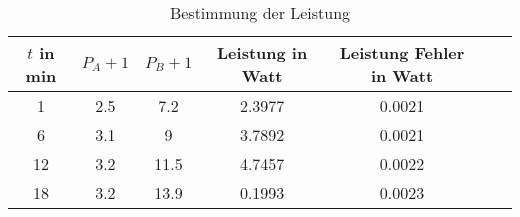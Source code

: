 \documentclass[captions=tableheading]{scrartcl}
\begin{document}
\begin{table}
  \centering
  \caption{Bestimmung der Leistung}
  \label{tab:guete}
  \begin{tabular}{c c c c c c c}
    \toprule
     $t$ in min &  $P_A +1$ &  $P_B+1$ & Leistung in Watt & Leistung Fehler in Watt\\
    \midrule
      1         & 2.5 & 7.2  & 2.3977   & 0.0021 \\
      6         & 3.1 & 9    & 3.7892   & 0.0021 \\
      12        & 3.2 & 11.5 & 4.7457   & 0.0022  \\
      18        & 3.2 & 13.9 & 0.1993   & 0.0023  \\
    \bottomrule
  \end{tabular}
\end{table}


\end{document}
